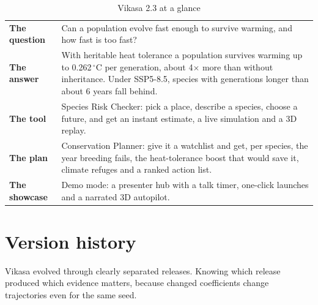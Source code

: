 \begin{table}[htbp]
\centering
\caption{Vikasa 2.3 at a glance}
\begin{tabularx}{\textwidth}{lL}
\toprule
\textbf{The question} & Can a population evolve fast enough to survive warming, and how fast is too fast? \\
\textbf{The answer} & With heritable heat tolerance a population survives warming up to 0.262\,$^{\circ}$C per generation, about 4$\times$ more than without inheritance. Under SSP5-8.5, species with generations longer than about 6 years fall behind. \\
\textbf{The tool} & Species Risk Checker: pick a place, describe a species, choose a future, and get an instant estimate, a live simulation and a 3D replay. \\
\textbf{The plan} & Conservation Planner: give it a watchlist and get, per species, the year breeding fails, the heat-tolerance boost that would save it, climate refuges and a ranked action list. \\
\textbf{The showcase} & Demo mode: a presenter hub with a talk timer, one-click launches and a narrated 3D autopilot. \\
\bottomrule
\end{tabularx}
\end{table}

\section{Version history}
Vikasa evolved through clearly separated releases. Knowing which release produced
which evidence matters, because changed coefficients change trajectories even for
the same seed.


